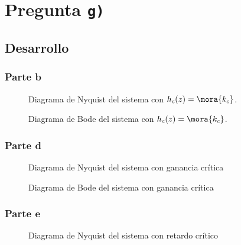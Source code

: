 \section{Pregunta \texttt{g)}}\label{pregunta-g}


\subsection{Desarrollo}

\subsubsection{Parte b}

\begin{figure}[h]
  \centering
  
  \caption{Diagrama de Nyquist del sistema con $h_{c}(z) = \mora{k_{c}}$.}
  \label{fig:nyquist-g1}
\end{figure}

\begin{figure}[h]
  \centering
  
  \caption{Diagrama de Bode del sistema con $h_{c}(z) = \mora{k_{c}}$.}
  \label{fig:bode-g1}
\end{figure}

\subsubsection{Parte d}

\begin{figure}[h]
  \centering
  
  \caption{Diagrama de Nyquist del sistema con ganancia crítica}
  \label{fig:nyquist-g2}
\end{figure}

\begin{figure}[h]
  \centering
  
  \caption{Diagrama de Bode del sistema con ganancia crítica}
  \label{fig:bode-g2}
\end{figure}

\subsubsection{Parte e}

\begin{figure}[h]
  \centering
  
  \caption{Diagrama de Nyquist del sistema con retardo crítico}
  \label{fig:nyquist-g3}
\end{figure}

